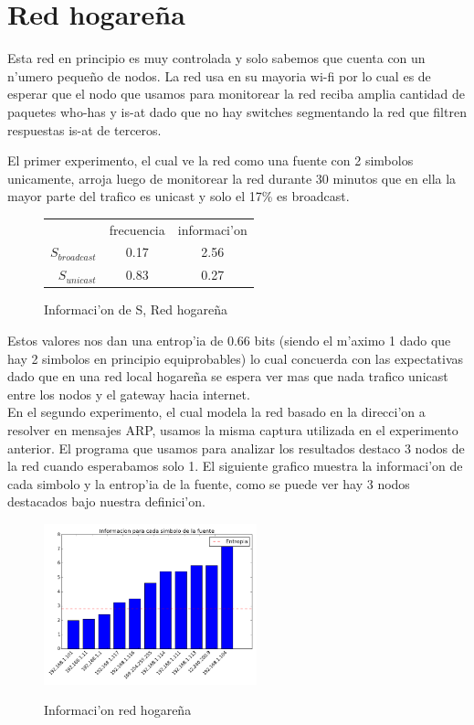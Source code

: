 \section{Red hogare\~na}
Esta red en principio es muy controlada y solo sabemos que cuenta con un n'umero peque\~no de nodos. La red usa
en su mayoria wi-fi por lo cual es de esperar que el nodo que usamos para monitorear la red reciba amplia cantidad de
paquetes who-has y is-at dado que no hay switches segmentando la red que filtren respuestas is-at de terceros.

El primer experimento, el cual ve la red como una fuente con 2 simbolos unicamente, arroja luego de monitorear la red durante
30 minutos que en ella  la mayor parte del trafico es unicast y solo el 17\% es broadcast.\\

\begin{figure}[!h]
\centering
\caption{Informaci'on de S, Red hogare\~na}
\begin{tabular}{ r|c|c| }
\multicolumn{1}{r}{}
 &  \multicolumn{1}{c}{frecuencia}
 & \multicolumn{1}{c}{informaci'on} \\
\cline{2-3}
$S_{broadcast}$ & 0.17 & 2.56 \\
\cline{2-3}
$S_{unicast}$ & 0.83 & 0.27 \\
\cline{2-3}
\end{tabular}
\end{figure}
 
Estos valores nos dan una entrop'ia de 0.66 bits (siendo el m'aximo 1 dado que hay 2 simbolos en principio equiprobables) lo
 cual concuerda con las expectativas dado que en una red local hogare\~na se espera ver mas que nada trafico unicast entre
 los nodos y el gateway hacia internet.\\
 
En el segundo experimento, el cual modela la red basado en la direcci'on a resolver en mensajes ARP, usamos la misma captura
utilizada en el experimento anterior. El programa que usamos para analizar los resultados destaco 3 nodos de la red cuando
esperabamos solo 1. El siguiente grafico muestra la informaci'on de cada simbolo y la entrop'ia de la fuente, como se puede
ver hay 3 nodos destacados bajo nuestra definici'on.\\
 
\begin{figure}[!h]
\centering
\caption{Informaci'on red hogare\~na}
\includegraphics[width=0.55\textwidth]{red1_info}
 \label{fig:red1info}
\end{figure}


